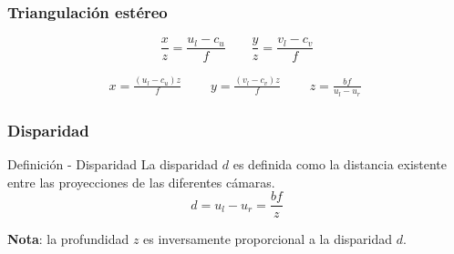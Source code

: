 \documentclass[compress]{beamer}
\begin{document}
\begin{frame}
\frametitle{Triangulación estéreo}

\begin{equation}
\frac{x}{z}=\frac{u_{l}-c_{u}}{f}\qquad\frac{y}{z}=\frac{v_{l}-c_{v}}{f}
\end{equation}

\begin{equation}
\begin{aligned}x=\frac{(u_{l}-c_{u})z}{f}\;\qquad
y=\frac{(v_{l}-c_{v})z}{f}\;\qquad
z=\frac{bf}{u_{l}-u_{r}}\;
\end{aligned}
\end{equation}

\begin{figure}[!htb]
	\centering
	\hfill
	\centering
	\hfill
\end{figure}
\end{frame}


\begin{frame}
\frametitle{Disparidad}

\begin{block}{Definición - Disparidad}
La disparidad $d$ es definida como la distancia existente entre las proyecciones de las diferentes cámaras.
\begin{equation}
d=u_{l}-u_{r}=\frac{bf}{z}
\end{equation}
\end{block}

\textbf{Nota}: la profundidad $z$ es inversamente proporcional a la disparidad $d$.

\end{frame}
\end{document}
